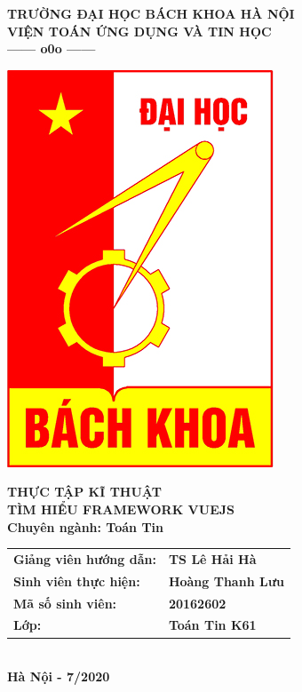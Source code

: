 \documentclass[12pt,a4paper]{report}
\begin{document}
	\thisfancypage{%
		\setlength{\fboxsep}{0pt}%
		\fbox}{} %
	\thispagestyle{empty}
	\begin{center}
		\vspace*{0.2cm}
		\fontsize{14}{12}
		\textbf{TRƯỜNG ĐẠI HỌC BÁCH KHOA HÀ NỘI}\\
		\textbf{VIỆN TOÁN ỨNG DỤNG VÀ TIN HỌC}\\
		\textbf{------ o0o ------}
	\end{center}
	\vspace*{0.8cm}
	\begin{center}
		\includegraphics[scale=.5]{bk.png}
	\end{center}
	\vspace*{0.8cm}
	\begin{center}
		\fontsize{20}{18}
		\textbf{THỰC TẬP KĨ THUẬT}\\
		\vspace*{0.8cm}
		\fontsize{18}{16}
		\textbf{TÌM HIỂU FRAMEWORK VUEJS}\\
		\fontsize{14}{16}
		\textbf{Chuyên ngành: Toán Tin}
	\end{center}
	\vspace*{0.7cm}
	\begin{center}
		\fontsize{14}{16}
		\begin{tabular}{ll}
			
			\textbf{Giảng viên hướng dẫn:} & \textbf{TS Lê Hải Hà} \\ 
			\textbf{Sinh viên thực hiện:} & \textbf{Hoàng Thanh Lưu} \\ 
			\textbf{Mã số sinh viên:} & \textbf{20162602}\\
			\textbf{Lớp:}  & \textbf{Toán Tin K61} \\ 
		\end{tabular} \\
		\vspace*{2.7cm}
		\fontsize{14}{16}
		\textbf{Hà Nội - 7/2020}
	\end{center}
	
\end{document}
